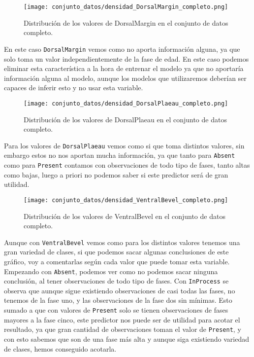 \begin{figure}[H]
	\centering
	\texttt{[image: conjunto\_datos/densidad\_DorsalMargin\_completo.png]}
	\caption{Distribución de los valores de DorsalMargin en el conjunto de datos completo.}
	\label{fig:densidad_DorsalMargin_completo}
\end{figure}


En este caso \texttt{DorsalMargin} vemos como no aporta información alguna, ya que solo toma un valor independientemente de la fase de edad. En este caso podemos eliminar esta característica a la hora de entrenar el modelo ya que no aportaría información alguna al modelo, aunque los modelos que utilizaremos deberían ser capaces de inferir esto y no usar esta variable.


\begin{figure}[H]
	\centering
	\texttt{[image: conjunto\_datos/densidad\_DorsalPlaeau\_completo.png]}
	\caption{Distribución de los valores de DorsalPlaeau en el conjunto de datos completo.}
	\label{fig:densidad_DorsalPlaeau_completo}
\end{figure}

Para los valores de \texttt{DorsalPlaeau} vemos como si que toma distintos valores, sin embargo estos no nos aportan mucha información, ya que tanto para \texttt{Absent} como para \texttt{Present} contamos con observaciones de todo tipo de fases, tanto altas como bajas, luego a priori no podemos saber si este predictor será de gran utilidad.


\begin{figure}[H]
	\centering
	\texttt{[image: conjunto\_datos/densidad\_VentralBevel\_completo.png]}
	\caption{Distribución de los valores de VentralBevel en el conjunto de datos completo.}
	\label{fig:densidad_VentralBevel_completo}
\end{figure}

Aunque con \texttt{VentralBevel} vemos como para los distintos valores tenemos una gran variedad de clases, si que podemos sacar algunas conclusiones de este gráfico, voy a comentarlas según cada valor que puede tomar esta variable. Empezando con \texttt{Absent}, podemos ver como no podemos sacar ninguna conclusión, al tener observaciones de todo tipo de fases. Con \texttt{InProcess} se observa que aunque sigue existiendo observaciones de casi todas las fases, no tenemos de la fase uno, y las observaciones de la fase dos sin mínimas. Esto sumado a que con valores de \texttt{Present} solo se tienen observaciones de fases mayores a la fase cinco, este predictor nos puede ser de utilidad para acotar el resultado, ya que gran cantidad de observaciones toman el valor de \texttt{Present}, y con esto sabemos que son de una fase más alta y aunque siga existiendo variedad de clases, hemos conseguido acotarla.

